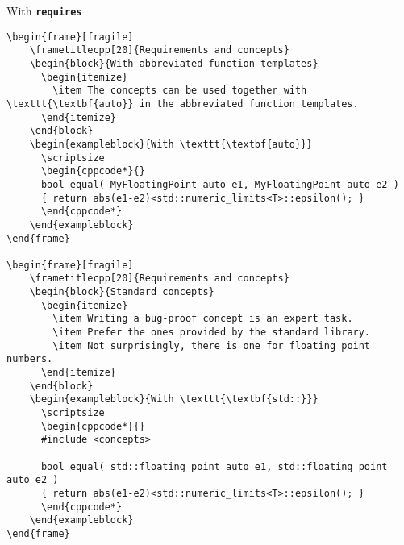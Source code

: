 \begin{frame}[fragile]
\begin{exampleblock}{With \texttt{\textbf{requires}}}
\begin{verbatim}
\begin{frame}[fragile]
    \frametitlecpp[20]{Requirements and concepts}
    \begin{block}{With abbreviated function templates}
      \begin{itemize}
        \item The concepts can be used together with \texttt{\textbf{auto}} in the abbreviated function templates.
      \end{itemize}
    \end{block}
    \begin{exampleblock}{With \texttt{\textbf{auto}}}
      \scriptsize
      \begin{cppcode*}{}
      bool equal( MyFloatingPoint auto e1, MyFloatingPoint auto e2 )
      { return abs(e1-e2)<std::numeric_limits<T>::epsilon(); }
      \end{cppcode*}
    \end{exampleblock}
\end{frame}

\begin{frame}[fragile]
    \frametitlecpp[20]{Requirements and concepts}
    \begin{block}{Standard concepts}
      \begin{itemize}
        \item Writing a bug-proof concept is an expert task.
        \item Prefer the ones provided by the standard library.
        \item Not surprisingly, there is one for floating point numbers.
      \end{itemize}
    \end{block}
    \begin{exampleblock}{With \texttt{\textbf{std::}}}
      \scriptsize
      \begin{cppcode*}{}
      #include <concepts>

      bool equal( std::floating_point auto e1, std::floating_point auto e2 )
      { return abs(e1-e2)<std::numeric_limits<T>::epsilon(); }
      \end{cppcode*}
    \end{exampleblock}
\end{frame}


\end{verbatim}
\end{exampleblock}
\end{frame}
